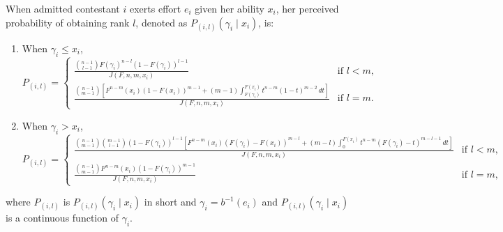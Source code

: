 
\begin{proposition}\label{prop:winProb}
When admitted contestant $i$ exerts effort $e_i$ given her ability $x_i$, her perceived probability of obtaining rank $l$, denoted as $P_{(i,l)}(\gamma_i \mid x_i)$, is:

\begin{enumerate}
    \item When $\gamma_i \leq x_i$,
\[
P_{(i,l)} =   
\begin{cases} 
\frac{\binom{n-1}{l-1}F(\gamma_i)^{n-l}(1-F(\gamma_i))^{l-1}}{J(F,n,m,x_i)} & \text{if } l < m, \\
\frac{\binom{n-1}{m-1}\left [ F^{n-m}(x_i)(1-F(x_i))^{m-1}+(m-1)\int_{F(\gamma_i)}^{F(x_i)}t^{n-m}(1-t)^{m-2} \, dt \right ]}{J(F,n,m,x_i)} & \text{if } l = m.
\end{cases}
\]
    \item When $\gamma_i > x_i$,
\[
P_{(i,l)} =   
\begin{cases} 
\frac{\binom{n-1}{m-1}\binom{m-1}{l-1}(1-F(\gamma_i))^{l-1}\left [F^{n-m}(x_i)(F(\gamma_i)-F(x_i))^{m-l}+(m-l)\int_{0}^{F(x_i)}t^{n-m}(F(\gamma_i)-t)^{m-l-1}\, dt\right]}{J(F,n,m,x_i)} & \text{if } l < m, \\
\frac{\binom{n-1}{m-1}F^{n-m}(x_i)(1-F(\gamma_i))^{m-1}}{J(F,n,m,x_i)} & \text{if } l = m,
\end{cases}
\]
\end{enumerate} 
where $P_{(i,l)}$ is $P_{(i,l)}(\gamma_i \mid x_i)$ in short and $\gamma_i = b^{-1}(e_i)$ and $P_{(i,l)}(\gamma_i \mid x_i)$ is a continuous function of $\gamma_i$. 
\end{proposition}

